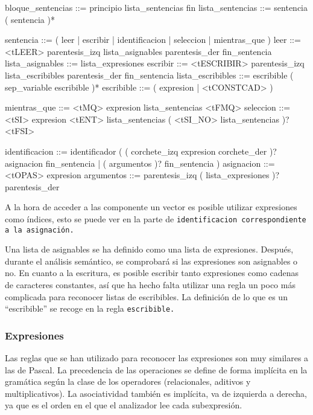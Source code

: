 \begin{codigo}
bloque_sentencias ::= principio lista_sentencias fin
lista_sentencias ::= sentencia ( sentencia )*

sentencia ::= ( leer | escribir | identificacion | seleccion | mientras_que )
leer ::= <tLEER> parentesis_izq lista_asignables parentesis_der fin_sentencia
lista_asignables ::= lista_expresiones
escribir ::= <tESCRIBIR> parentesis_izq lista_escribibles parentesis_der fin_sentencia
lista_escribibles ::= escribible ( sep_variable escribible )*
escribible ::= ( expresion | <tCONSTCAD> )

mientras_que ::= <tMQ> expresion lista_sentencias <tFMQ>
seleccion ::= <tSI> expresion <tENT> lista_sentencias ( <tSI_NO> lista_sentencias )? <tFSI>

identificacion ::= identificador ( ( corchete_izq expresion corchete_der )? asignacion fin_sentencia | ( argumentos )? fin_sentencia )
asignacion ::= <tOPAS> expresion
argumentos ::= parentesis_izq ( lista_expresiones )? parentesis_der
\end{codigo}

A la hora de acceder a las componente un vector es posible utilizar expresiones como índices, esto se puede ver en la parte de \tt{identificacion} correspondiente a la asignación.

Una lista de asignables se ha definido como una lista de expresiones. Después, durante el análisis semántico, se comprobará si las expresiones son asignables o no. En cuanto a la escritura, es posible escribir tanto expresiones como cadenas de caracteres constantes, así que ha hecho falta utilizar una regla un poco más complicada para reconocer listas de escribibles. La definición de lo que es un ``escribible'' se recoge en la regla \tt{escribible}.

\subsubsection{Expresiones}
Las reglas que se han utilizado para reconocer las expresiones son muy similares a las de Pascal. La precedencia de las operaciones se define de forma implícita en la gramática según la clase de los operadores (relacionales, aditivos y multiplicativos). La asociatividad también es implícita, va de izquierda a derecha, ya que es el orden en el que el analizador lee cada subexpresión.

